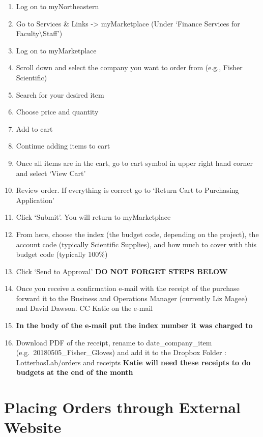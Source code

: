 \documentclass[
  letterpaper,
  DIV=11,
  numbers=noendperiod]{scrreprt}
\begin{document}
\begin{enumerate}
\def\labelenumi{\arabic{enumi}.}
\item
  Log on to myNortheastern
\item
  Go to Services \& Links -\textgreater{} myMarketplace (Under `Finance
  Services for Faculty\textbackslash Staff')
\item
  Log on to myMarketplace
\item
  Scroll down and select the company you want to order from (e.g.,
  Fisher Scientific)
\item
  Search for your desired item
\item
  Choose price and quantity
\item
  Add to cart
\item
  Continue adding items to cart
\item
  Once all items are in the cart, go to cart symbol in upper right hand
  corner and select `View Cart'
\item
  Review order. If everything is correct go to `Return Cart to
  Purchasing Application'
\item
  Click `Submit'. You will return to myMarketplace
\item
  From here, choose the index (the budget code, depending on the
  project), the account code (typically Scientific Supplies), and how
  much to cover with this budget code (typically 100\%)
\item
  Click `Send to Approval' \textbf{DO NOT FORGET STEPS BELOW}
\item
  Once you receive a confirmation e-mail with the receipt of the
  purchase forward it to the Business and Operations Manager (currently
  Liz Magee) and David Dawson. CC Katie on the e-mail
\item
  \textbf{In the body of the e-mail put the index number it was charged
  to}
\item
  Download PDF of the receipt, rename to date\_company\_item
  (e.g.~20180505\_Fisher\_Gloves) and add it to the Dropbox Folder :
  LotterhosLab/orders and receipts \textbf{Katie will need these
  receipts to do budgets at the end of the month}
\end{enumerate}

\hypertarget{placing-orders-through-external-website}{%
\section*{\texorpdfstring{\textbf{Placing Orders through External
Website}}{Placing Orders through External Website}}\label{placing-orders-through-external-website}}
\end{document}
